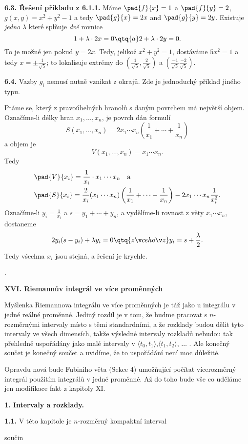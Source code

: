 \documentclass[12pt]{article}
\begin{document}
{ 
 \bigskip
 
 {\bf 6.3. Řešení příkladu z 6.1.1.} 
 Máme $\pad{f}{x}=1$ a $\pad{f}{y}=2$, $g(x,y)=x^2+y^2-1$ a tedy $\pad{g}{x}=2x$ and $\pad{g}{y}=2y$. Existuje {\em jedno} $\lambda$ které splňuje {\em dvě} rovnice
 $$
 1+\lambda\cdot2x=0 \qtq{a}  2+\lambda\cdot2y=0.
 $$
 To je možné jen pokud  $y=2x$. Tedy, jelikož $x^2+y^2=1$, dostáváme $5x^2=1$ a tedy $x=\pm\frac{1}{\sqrt 5}$; to lokalisuje extrémy do $(\frac{1}{\sqrt 5},\frac{2}{\sqrt 5})$ a
 $(\frac{-1}{\sqrt 5}\frac{-2}{\sqrt 5})$.
 
 \bigskip
 
 {\bf 6.4.} Vazby $g_i$ nemusí nutně vznikat z okrajů. 
Zde je jednoduchý příklad jiného typu.
 
 Ptáme se, který z pravoúhelných hranolů s daným povrchem
má největší objem.
Označíme-li délky hran $x_1,\dots,x_n$, je povrch dán formulí
 $$
 S(x_1,\dots,x_n)=2x_1\cdots x_n\left(\frac1{x_1}+\cdots+\frac{1}{x_n}\right)
 $$
 a objem je
 $$
 V(x_1,\dots,x_n)=x_1\cdots x_n.
 $$
Tedy
 $$
 \begin{aligned}
 &\pad{V}{x_i}=\frac1{x_i}\cdot x_1\cdots x_n\quad \text{a}\\ 
 &\pad{S}{x_i}=\frac2{x_i}(x_1\cdots x_n)\left(\frac1{x_1}+\cdots+\frac{1}{x_n}\right)-2x_1\cdots x_n\frac1{x^2_i}.
 \end{aligned}
 $$
Označíme-li $y_i=\frac1{x_i}$ a $s=y_1+\cdots+y_n$, a vydělíme-li rovnost z věty 
 $x_1\cdots x_n$, dostaneme
 $$
 2y_i(s-y_i)+\lambda y_i=0 \qtq{z čehož} y_i=s+\frac{\lambda}{2}.
 $$
 Tedy všechna $x_i$ jsou stejná, a řešení je krychle.

 
\newpage

. 
 
\newpage

 \centerline{\Large\bf XVI. Riemannův integrál ve více proměnných} 
 
 
 \vskip10mm
 
 
 Myšlenka Riemannova integrálu ve více proměnných je táž jako u integrálu v jedné reálné proměnné. Jediný rozdíl je v tom, že budme pracovat s $n$-rozměrnými intervaly místo s těmi standardními, a že rozklady budou dělit tyto intervaly ve všech dimensích, takže výsledné intervaly rozkladů nebudou tak přehledně uspořádány jako
 malé intervaly v $\langle t_0,t_1\rangle$,$\langle t_1,t_2\rangle$, $\dots$ .
 Ale konečný součet je konečný součet a uvidíme, že to uspořádání není moc důležité.
 
 \smallskip
 
 Opravdu nová bude Fubiniho věta (Sekce 4) umožňující počítat vícerozměrný integrál použitím integrálů v jedné proměnné. Až do toho bude vše co uděláme jen modifikace fakt z kapitoly XI.
 
 
 
 
 \vskip10mm
 
  
 {\large\bf 1. Intervaly a rozklady.}
 
 \bigskip
 
{\bf 1.1.} V této kapitole je $n$-rozměrný kompaktní interval}  součin
\end{document}
